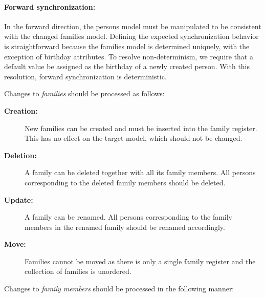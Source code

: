 \paragraph{Forward synchronization:}

In the forward direction, the persons model must be manipulated to be consistent with the changed families model.
Defining the expected synchronization behavior is straightforward because the families model is determined uniquely, with the exception of birthday attributes.
To resolve non-determinism, we require that a default value be assigned as the birthday of a newly created person.
With this resolution, forward synchronization is deterministic.

\medskip
\noindent Changes to \emph{families} should be processed as follows:

\begin{description}
    \item[\textbf{Creation:}]
    New families can be created and must be inserted into the family register.
    This has no effect on the target model, which should not be changed.
    
    \item[\textbf{Deletion:}]
    A family can be deleted together with all its family members.
    All persons corresponding to the deleted family members should be deleted.
    
    \item[\textbf{Update:}]
    A family can be renamed.  All persons corresponding to the family members in the renamed family should be renamed accordingly.
    
    \item[\textbf{Move:}]
    Families cannot be moved as there is only a single family register and the collection of families is unordered.
\end{description}

\noindent Changes to \emph{family members} should be processed in the following manner: 

